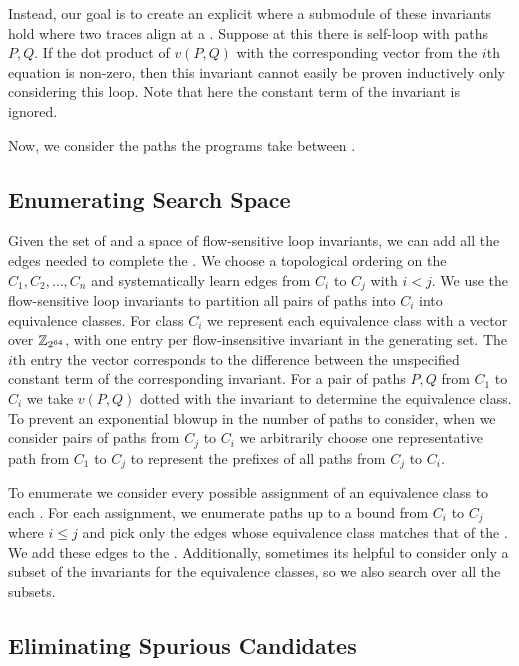 Instead, our goal is to create an explicit \bisim{} where a submodule
of these invariants hold where two traces align at a \cutpoint.
Suppose at this \cutpoint{} there is self-loop with paths $P, Q$.
If the dot product of $v(P,Q)$ with the corresponding vector from
the $i$th equation is non-zero, then this invariant cannot easily be
proven inductively only considering this loop. Note that here the
constant term of the invariant is ignored. 

Now, we consider the paths the programs take between \cutpoints.

\subsection{Enumerating Search Space} \label{algstep4}

Given the set of \cutpoints and{} a space of flow-sensitive loop
invariants, we can add all the edges needed to complete the \bisimrep.
We choose a topological ordering on the \cutpoints{} $C_1, C_2,
\dotsc, C_n$ and systematically learn edges from $C_i$ to $C_j$ with
$i < j$. We use the flow-sensitive loop invariants to partition all
pairs of paths into $C_i$ into equivalence classes. For class $C_i$
we represent each equivalence class with a vector over $\mathbb{Z}_{2^{64}}$,
with one entry per flow-insensitive invariant in the generating set.
The $i$th entry the vector corresponds to the difference between
the unspecified constant term of the corresponding invariant. For
a pair of paths $P, Q$ from $C_1$ to $C_i$ we take $v(P,Q)$ dotted
with the invariant to determine the equivalence class. To prevent
an exponential blowup in the number of paths to consider, when we
consider pairs of paths from $C_j$ to $C_i$ we arbitrarily choose one
representative path from $C_1$ to $C_j$ to represent the prefixes of
all paths from $C_j$ to $C_i$.  

To enumerate \bisimreps{} we consider every possible assignment of an
equivalence class to each \cutpoint. For each assignment, we enumerate
paths up to a bound from $C_i$ to $C_j$ where $i \leq j$ and pick only
the edges whose equivalence class matches that of the \cutpoint. We
add these edges to the \bisimrep. Additionally, sometimes its helpful
to consider only a subset of the invariants for the equivalence
classes, so we also search over all the subsets.

\subsection{Eliminating Spurious Candidates} \label{algstep5}

